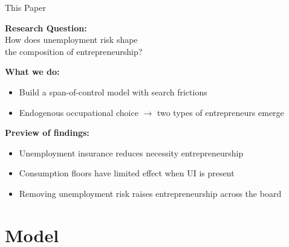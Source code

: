 \documentclass[aspectratio=169, 11pt]{beamer}
\begin{document}
\begin{frame}{This Paper}
    \begin{center}
        \Large
        \textbf{Research Question:} \\[0.8em]
        How does unemployment risk shape \\
        the composition of entrepreneurship? \\[1.5em]
    \end{center}

    \textbf{What we do:}
    \begin{itemize}
        \item Build a span-of-control model with search frictions
        \item Endogenous occupational choice $\rightarrow$ two types of entrepreneurs emerge
    \end{itemize}

    \vspace{0.5em}

    \textbf{Preview of findings:}
    \begin{itemize}
        \item Unemployment insurance reduces necessity entrepreneurship
        \item Consumption floors have limited effect when UI is present
        \item Removing unemployment risk raises entrepreneurship across the board
    \end{itemize}
\end{frame}


\section{Model}

\end{document}
